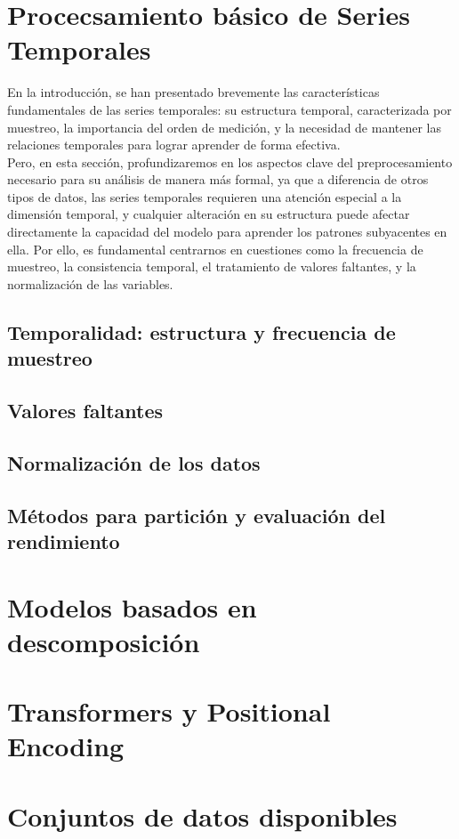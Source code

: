 \section{Procecsamiento básico de Series Temporales}

En la introducción, se han presentado brevemente las características fundamentales de las series temporales: su estructura temporal, caracterizada por muestreo, la importancia del orden de medición, y la necesidad de mantener las relaciones temporales para lograr aprender de forma efectiva.\\

Pero, en esta sección, profundizaremos en los aspectos clave del preprocesamiento necesario para su análisis de manera más formal, ya que a diferencia de otros tipos de datos, las series temporales requieren una atención especial a la dimensión temporal, y cualquier alteración en su estructura puede afectar directamente la capacidad del modelo para aprender los patrones subyacentes en ella. Por ello, es fundamental centrarnos en cuestiones como la frecuencia de muestreo, la consistencia temporal, el tratamiento de valores faltantes, y la normalización de las variables.

\subsection{Temporalidad: estructura y frecuencia de muestreo}

\subsection{Valores faltantes}

\subsection{Normalización de los datos}

\subsection{Métodos para partición y evaluación del rendimiento}

\section{Modelos basados en descomposición}

\section{Transformers y Positional Encoding}

\section{Conjuntos de datos disponibles}
